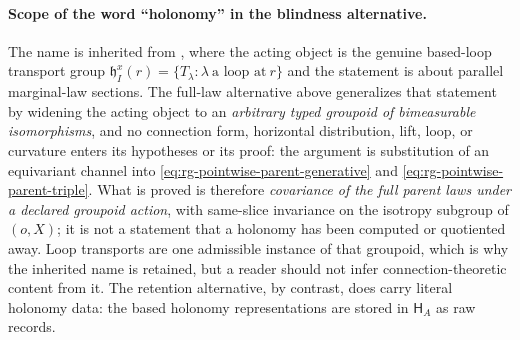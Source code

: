 \paragraph{Scope of the word ``holonomy'' in the blindness alternative.}
The name is inherited from
, where the acting object is the genuine based-loop transport group
$\mathfrak h_I^x(r)=\{T_\lambda:\lambda\ \text{a loop at}\ r\}$ and the statement is about parallel
marginal-law sections. The full-law alternative above generalizes that statement by widening the
acting object to an \emph{arbitrary typed groupoid of bimeasurable isomorphisms}, and no connection
form, horizontal distribution, lift, loop, or curvature enters its hypotheses or its proof: the
argument is substitution of an equivariant channel into
\eqref{eq:rg-pointwise-parent-generative} and \eqref{eq:rg-pointwise-parent-triple}. What is proved is
therefore \emph{covariance of the full parent laws under a declared groupoid action}, with
same-slice invariance on the isotropy subgroup of $(o,X)$; it is not a statement that a holonomy has
been computed or quotiented away. Loop transports are one admissible instance of that groupoid, which
is why the inherited name is retained, but a reader should not infer connection-theoretic content
from it. The retention alternative, by contrast, does carry literal holonomy data: the based holonomy
representations are stored in $\mathsf H_A$ as raw records. 

